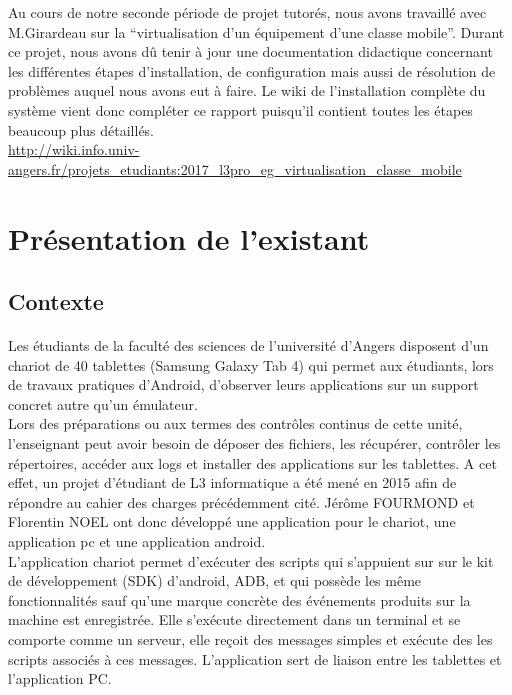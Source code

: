 \documentclass[a4paper,12pt]{extarticle}
\begin{document}
Au cours de notre seconde période de projet tutorés, nous avons travaillé avec M.Girardeau sur la “virtualisation d’un équipement d’une classe mobile”. Durant ce projet, nous avons dû tenir à jour une documentation didactique concernant les différentes étapes d’installation, de configuration mais aussi de résolution de problèmes auquel nous avons eut à faire.
Le wiki de l’installation complète du système vient donc compléter ce rapport puisqu’il contient toutes les étapes beaucoup plus détaillés.\\

\url{http://wiki.info.univ-angers.fr/projets_etudiants:2017_l3pro_eg_virtualisation_classe_mobile}

\clearpage

\section{Présentation de l'existant}

\subsection{Contexte}
\paragraph{}
Les étudiants de la faculté des sciences de l’université d’Angers disposent d’un chariot de 40 tablettes (Samsung Galaxy Tab 4) qui permet aux étudiants, lors de travaux pratiques d’Android, d’observer leurs applications sur un support concret autre qu’un émulateur.\\


Lors des préparations ou aux termes des contrôles continus de cette unité, l’enseignant peut avoir besoin de déposer des fichiers, les récupérer, contrôler les répertoires, accéder aux logs et installer des applications sur les tablettes.
A cet effet, un projet d’étudiant de L3 informatique a été mené en 2015 afin de répondre au cahier des charges précédemment cité. Jérôme FOURMOND et Florentin NOEL ont donc développé une application pour le chariot, une application pc et une application android.\\

L’application chariot permet d’exécuter des scripts qui s’appuient sur sur le kit de développement (SDK) d’android, ADB, et qui possède les même fonctionnalités sauf qu’une marque concrète des événements produits sur la machine est enregistrée.  Elle s'exécute directement dans un terminal et  se comporte comme un serveur, elle reçoit des messages simples et exécute des les scripts associés à ces messages. L’application sert de liaison entre les tablettes et l’application PC.\\
\end{document}
